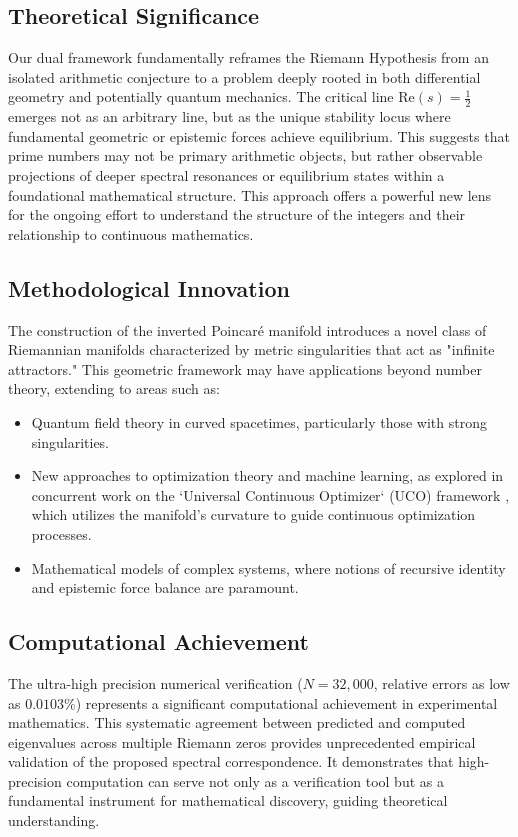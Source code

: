 \documentclass[12pt]{article}
\begin{document}
\subsection{Theoretical Significance}
Our dual framework fundamentally reframes the Riemann Hypothesis from an isolated arithmetic conjecture to a problem deeply rooted in both differential geometry and potentially quantum mechanics. The critical line $\text{Re}(s) = \frac{1}{2}$ emerges not as an arbitrary line, but as the unique stability locus where fundamental geometric or epistemic forces achieve equilibrium. This suggests that prime numbers may not be primary arithmetic objects, but rather observable projections of deeper spectral resonances or equilibrium states within a foundational mathematical structure. This approach offers a powerful new lens for the ongoing effort to understand the structure of the integers and their relationship to continuous mathematics.

\subsection{Methodological Innovation}
The construction of the inverted Poincaré manifold introduces a novel class of Riemannian manifolds characterized by metric singularities that act as "infinite attractors." This geometric framework may have applications beyond number theory, extending to areas such as:
\begin{itemize}
    \item Quantum field theory in curved spacetimes, particularly those with strong singularities.
    \item New approaches to optimization theory and machine learning, as explored in concurrent work on the `Universal Continuous Optimizer` (UCO) framework \cite{iyer2025uco}, which utilizes the manifold's curvature to guide continuous optimization processes.
    \item Mathematical models of complex systems, where notions of recursive identity and epistemic force balance are paramount.
\end{itemize}

\subsection{Computational Achievement}
The ultra-high precision numerical verification ($N = 32{,}000$, relative errors as low as $0.0103\%$) represents a significant computational achievement in experimental mathematics. This systematic agreement between predicted and computed eigenvalues across multiple Riemann zeros provides unprecedented empirical validation of the proposed spectral correspondence. It demonstrates that high-precision computation can serve not only as a verification tool but as a fundamental instrument for mathematical discovery, guiding theoretical understanding.
\end{document}

